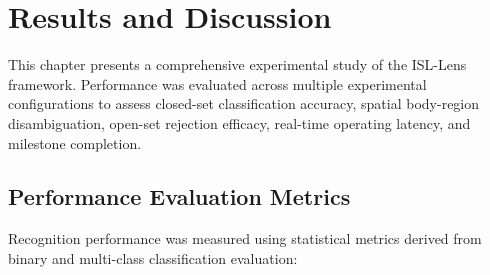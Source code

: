 \chapter{Results and Discussion}

This chapter presents a comprehensive experimental study of the ISL-Lens framework. Performance was evaluated across multiple experimental configurations to assess closed-set classification accuracy, spatial body-region disambiguation, open-set rejection efficacy, real-time operating latency, and milestone completion.

\section{Performance Evaluation Metrics}

Recognition performance was measured using statistical metrics derived from binary and multi-class classification evaluation:
